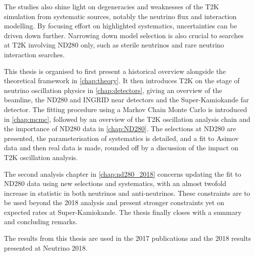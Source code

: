 The studies also shine light on degeneracies and weaknesses of the T2K simulation from systematic sources, notably the neutrino flux and interaction modelling. By focusing effort on highlighted systematics, uncertainties can be driven down further. Narrowing down model selection is also crucial to searches at T2K involving ND280 only, such as sterile neutrinos and rare neutrino interaction searches.

This thesis is organised to first present a historical overview alongside the theoretical framework in \autoref{chap:theory}. It then introduces T2K on the stage of neutrino oscillation physics in \autoref{chap:detectors}, giving an overview of the beamline, the ND280 and INGRID near detectors and the Super-Kamiokande far detector. The fitting procedure using a Markov Chain Monte Carlo is introduced in \autoref{chap:mcmc}, followed by an overview of the T2K oscillation analysis chain and the importance of ND280 data in \autoref{chap:ND280}. The selections at ND280 are presented, the parameterisation of systematics is detailed, and a fit to Asimov data and then real data is made, rounded off by a discussion of the impact on T2K oscillation analysis.

The second analysis chapter in \autoref{chap:nd280_2018} concerns updating the fit to ND280 data using new selections and systematics, with an almost twofold increase in statistic in both neutrinos and anti-neutrinos. These constraints are to be used beyond the 2018 analysis and present stronger constraints yet on expected rates at Super-Kamiokande. The thesis finally closes with a summary and concluding remarks.

The results from this thesis are used in the 2017 publications\cite{t2k_2017} and the 2018 results presented at Neutrino 2018\cite{t2k_neutrino2018}. 